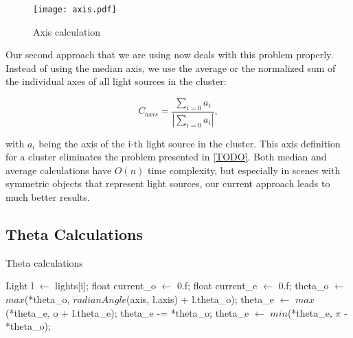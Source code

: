 \begin{figure}
	\begin{center}
		\texttt{[image: axis.pdf]}
		\caption{Axis calculation}
		\label{fig:axis}
	\end{center}
\end{figure}

Our second approach that we are using now deals with this problem properly. Instead of using the median axis, we use the average or the normalized sum of the individual axes of all light sources in the cluster:

\begin{equation}
C_{axis} = \frac{\sum_{i = 0} a_i}{|\sum_{i = 0} a_i|},
\end{equation}

with $a_i$ being the axis of the i-th light source in the cluster. This axis definition for a cluster eliminates the problem presented in \ref{TODO}. Both median and average calculations have $O(n)$ time complexity, but especially in scenes with symmetric objects that represent light sources, our current approach leads to much better results.

\subsection{Theta Calculations}
\label{subs:theta}

\begin{algorithm}
	\caption{Theta calculations}
	\label{thetacalculations}
	\begin{algorithmic}[1] %
			\State Light l $\gets$ lights[i];
			\State float current\_o $\gets$ 0.f;
			\State float current\_e $\gets$ 0.f;	
			\State 	*theta\_o $\gets$ $max$(*theta\_o, $radianAngle$(axis, l.axis) + l.theta\_o);
			\State *theta\_e $\gets$ $max$(*theta\_e, o + l.theta\_e);
		\EndFor
		\State *theta\_e -= *theta\_o;
		\State *theta\_e $\gets$ $min$(*theta\_e, $\pi$ - *theta\_o);
		\EndProcedure
	\end{algorithmic}
\end{algorithm}

